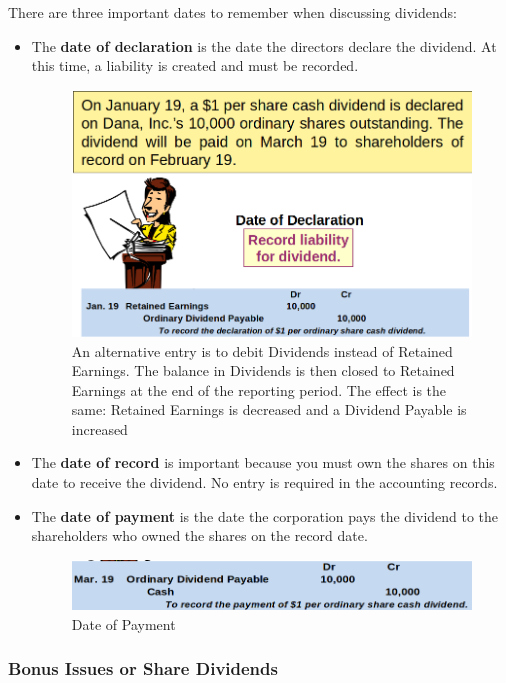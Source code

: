 \documentclass[../main.tex]{subfiles}
\begin{document}
	There are three important dates to remember when discussing dividends:
	\begin{itemize}[noitemsep]
		\item The \textbf{date of declaration} is the date the directors 
		declare the dividend. At this time, a liability is created and must be 
		recorded.
		\begin{figure}[ht]
			\centering
			\includegraphics[width=\columnwidth]{images/c9/dividend_declaration.png}
			\caption{An alternative entry is to debit Dividends instead of 
			Retained Earnings. The balance in Dividends is then closed to 
			Retained Earnings at the end of the reporting period. The effect is 
			the same: Retained Earnings is decreased and a Dividend Payable is 
			increased}
		\end{figure}
		\item The \textbf{date of record} is important because you must own the 
		shares on this date to receive the dividend.  No entry is required in 
		the accounting records.  
		\item The \textbf{date of payment} is the date the corporation pays the 
		dividend to the shareholders who owned the shares on the record date.
				\begin{figure}[ht]
			\centering
			\includegraphics[width=\columnwidth]{images/c9/incoporated_date.png}
			\caption{Date of Payment}
		\end{figure}
	\end{itemize}
	
	\subsubsection{Bonus Issues or Share Dividends}
	
\end{document}
